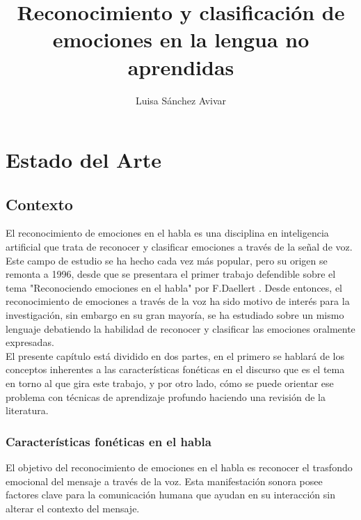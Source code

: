\documentclass[11pt,a4paper,spanish]{book}
\begin{document}
	\title{Reconocimiento y clasificación de emociones en la lengua no aprendidas}
	\author{Luisa Sánchez Avivar}
	
	\chapter{Estado del Arte}
	\section{Contexto}
	El reconocimiento de emociones en el habla es una disciplina en inteligencia artificial que trata de reconocer y clasificar emociones a través de la señal de voz. Este campo de estudio se ha hecho cada vez más popular, pero su origen se remonta a 1996, desde que se presentara el primer trabajo defendible sobre el tema "Reconociendo emociones en el habla" por F.Daellert \cite{Dellaert1996}.
	Desde entonces, el reconocimiento de emociones a través de la voz ha sido motivo de interés para la investigación, sin embargo en su gran mayoría, se ha estudiado sobre un mismo lenguaje debatiendo la habilidad de reconocer y clasificar las emociones oralmente expresadas. \\
	
	El presente capítulo está dividido en dos partes, en el primero se hablará de los conceptos inherentes a las características fonéticas en el discurso que es el tema en torno al que gira este trabajo, y por otro lado, cómo se puede orientar ese problema con técnicas de aprendizaje profundo haciendo una revisión de la literatura.
	
	
	\subsection{Características fonéticas en el habla}
	El objetivo del reconocimiento de emociones en el habla es reconocer el trasfondo emocional del mensaje a través de la voz. Esta manifestación sonora posee factores clave para la comunicación humana que ayudan en su interacción sin alterar el contexto del mensaje.\\
	
\end{document}
